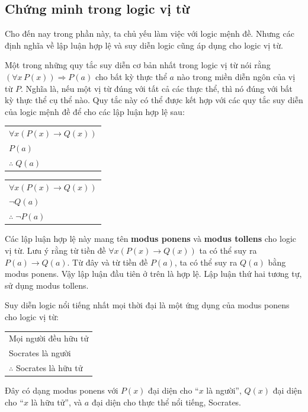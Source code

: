 \subsection{Chứng minh trong logic vị từ}

Cho đến nay trong phần này, ta chủ yếu làm việc với logic mệnh đề. Nhưng các định nghĩa về lập luận hợp lệ và suy diễn logic cũng áp dụng cho logic vị từ.

Một trong những quy tắc suy diễn cơ bản nhất trong logic vị từ nói rằng $(\forall x\, P(x)) \Longrightarrow P(a)$ cho bất kỳ thực thể $a$ nào trong miền diễn ngôn của vị từ $P$. Nghĩa là, nếu một vị từ đúng với tất cả các thực thể, thì nó đúng với bất kỳ thực thể cụ thể nào. Quy tắc này có thể được kết hợp với các quy tắc suy diễn của logic mệnh đề để cho các lập luận hợp lệ sau:
\begin{center}
\begin{minipage}{0.35\textwidth}
\begin{tabular}{l}
$\forall x(P(x) \to Q(x))$ \\
$P(a)$ \\
\hline
$\therefore\; Q(a)$
\end{tabular}
\end{minipage}
\hfill
\begin{minipage}{0.35\textwidth}
\begin{tabular}{l}
$\forall x(P(x) \to Q(x))$ \\
$\neg Q(a)$ \\
\hline
$\therefore\; \neg P(a)$
\end{tabular}
\end{minipage}
\end{center}
Các lập luận hợp lệ này mang tên \textbf{modus ponens} và \textbf{modus tollens} cho logic vị từ. Lưu ý rằng từ tiền đề $\forall x(P(x) \to Q(x))$ ta có thể suy ra $P(a) \to Q(a)$. Từ đây và từ tiền đề $P(a)$, ta có thể suy ra $Q(a)$ bằng modus ponens. Vậy lập luận đầu tiên ở trên là hợp lệ. Lập luận thứ hai tương tự, sử dụng modus tollens.

Suy diễn logic nổi tiếng nhất mọi thời đại là một ứng dụng của modus ponens cho logic vị từ:
\begin{center}
\begin{tabular}{l}
Mọi người đều hữu tử \\
Socrates là người \\
\hline
$\therefore$ Socrates là hữu tử
\end{tabular}
\end{center}
Đây có dạng modus ponens với $P(x)$ đại diện cho ``$x$ là người'', $Q(x)$ đại diện cho ``$x$ là hữu tử'', và $a$ đại diện cho thực thể nổi tiếng, Socrates.

